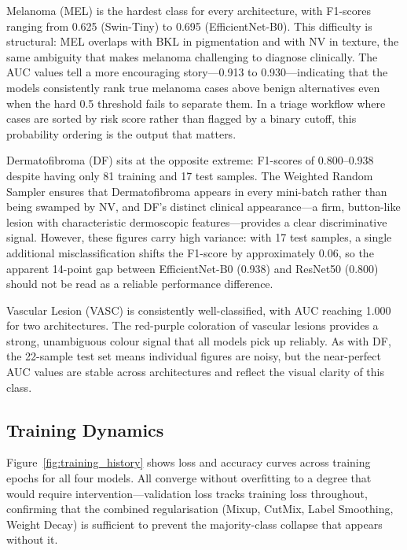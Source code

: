 Melanoma (MEL) is the hardest class for every architecture, with F1-scores ranging from 0.625 (Swin-Tiny) to 0.695 (EfficientNet-B0). This difficulty is structural: MEL overlaps with BKL in pigmentation and with NV in texture, the same ambiguity that makes melanoma challenging to diagnose clinically. The AUC values tell a more encouraging story---0.913 to 0.930---indicating that the models consistently rank true melanoma cases above benign alternatives even when the hard 0.5 threshold fails to separate them. In a triage workflow where cases are sorted by risk score rather than flagged by a binary cutoff, this probability ordering is the output that matters.

Dermatofibroma (DF) sits at the opposite extreme: F1-scores of 0.800--0.938 despite having only 81 training and 17 test samples. The Weighted Random Sampler ensures that Dermatofibroma appears in every mini-batch rather than being swamped by NV, and DF's distinct clinical appearance---a firm, button-like lesion with characteristic dermoscopic features---provides a clear discriminative signal. However, these figures carry high variance: with 17 test samples, a single additional misclassification shifts the F1-score by approximately 0.06, so the apparent 14-point gap between EfficientNet-B0 (0.938) and ResNet50 (0.800) should not be read as a reliable performance difference.

Vascular Lesion (VASC) is consistently well-classified, with AUC reaching 1.000 for two architectures. The red-purple coloration of vascular lesions provides a strong, unambiguous colour signal that all models pick up reliably. As with DF, the 22-sample test set means individual figures are noisy, but the near-perfect AUC values are stable across architectures and reflect the visual clarity of this class.

\subsection{Training Dynamics}

Figure~\ref{fig:training_history} shows loss and accuracy curves across training epochs for all four models. All converge without overfitting to a degree that would require intervention---validation loss tracks training loss throughout, confirming that the combined regularisation (Mixup, CutMix, Label Smoothing, Weight Decay) is sufficient to prevent the majority-class collapse that appears without it.


